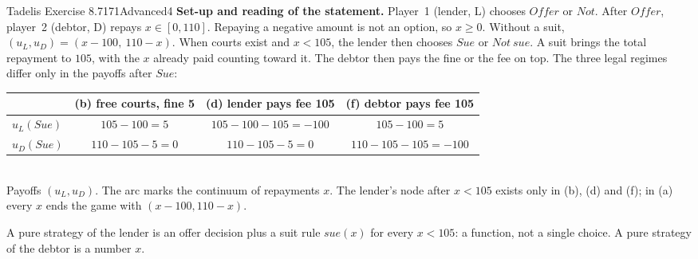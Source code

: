 \begin{exsol}{Tadelis Exercise 8.7}{171}{Advanced}{4}
\solution
\textbf{Set-up and reading of the statement.} Player~1 (lender, L) chooses $\mathit{Offer}$ or
$\mathit{Not}$. After $\mathit{Offer}$, player~2 (debtor, D) repays $x \in [0, 110]$. Repaying a
negative amount is not an option, so $x \ge 0$. Without a suit, $(u_L, u_D) = (x - 100,\ 110 - x)$.
When courts exist and $x < 105$, the lender then chooses $\mathit{Sue}$ or $\mathit{Not\ sue}$. A suit
brings the total repayment to $105$, with the $x$ already paid counting toward it. The debtor
then pays the fine or the fee on top. The three legal regimes differ only in the payoffs after
$\mathit{Sue}$:
\begin{center}
\begin{tabular}{lccc}
\toprule
& (b) free courts, fine 5 & (d) lender pays fee 105 & (f) debtor pays fee 105 \\
\midrule
$u_L(\mathit{Sue})$ & $105-100 = 5$ & $105 - 100 - 105 = -100$ & $105-100 = 5$ \\
$u_D(\mathit{Sue})$ & $110 - 105 - 5 = 0$ & $110 - 105 - 5 = 0$ & $110 - 105 - 105 = -100$ \\
\bottomrule
\end{tabular}
\end{center}
\begin{center}
\\[2pt]
{\footnotesize Payoffs $(u_L,u_D)$. The arc marks the continuum of repayments $x$. The lender's node
after $x<105$ exists only in (b), (d) and (f); in (a) every $x$ ends the game with
$(x-100, 110-x)$.}
\end{center}
A pure strategy of the lender is an offer decision plus a suit rule $\mathit{sue}(x)$ for every
$x < 105$: a function, not a single choice. A pure strategy of the debtor is a number $x$.


\end{exsol}
